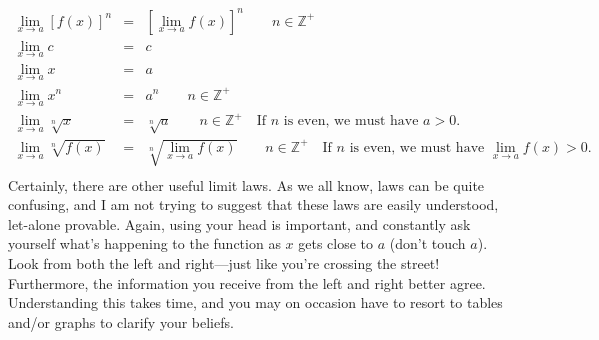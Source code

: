 \documentclass[12pt,addpoints, answers, fleqn]{exam}
\begin{document}
\begin{eqnarray*}
\mathop {\lim }\limits_{x \to a }  \left[ f \left( x \right) \right]^n &=& \left[ \mathop {\lim }\limits_{x \to a }   f \left( x \right) \right]^n \qquad n \in \mathbb{Z}^+\\
\mathop {\lim }\limits_{x \to a }  c &=& c\\
\mathop {\lim }\limits_{x \to a }  x &=& a\\
\mathop {\lim }\limits_{x \to a }  x^n &=& a^n \qquad n \in \mathbb{Z}^+ \\
\mathop {\lim }\limits_{x \to a }  \sqrt[n]{x} &=& \sqrt[n]{a} \qquad n \in \mathbb{Z}^+ \quad \mbox{If $n$ is even, we must have $a>0$.}\\
\mathop {\lim }\limits_{x \to a }  \sqrt[n]{f\left(x\right)} &=& \sqrt[n]{\mathop {\lim }\limits_{x \to a }  f\left(x\right)} \qquad n \in \mathbb{Z}^+ \quad \mbox{If $n$ is even, we must have $\mathop {\lim }\limits_{x \to a }  f\left(x\right)>0$.}\\
\end{eqnarray*}
Certainly, there are other useful limit laws. As we all know, laws can be quite confusing, and I am not trying to suggest that these laws are easily understood, let-alone provable. Again, using your head is important, and constantly ask yourself what's happening to the function as $x$ gets close to $a$ (don't touch $a$). Look from both the left and right---just like you're crossing the street! Furthermore, the information you receive from the left and right better agree. Understanding this takes time, and you may on occasion have to resort to tables and/or graphs to clarify your beliefs.
\end{document}
